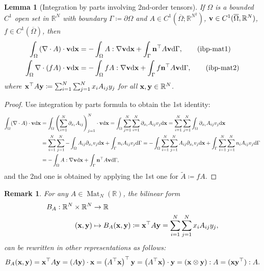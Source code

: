 \documentclass[oneside]{book}
\numberwithin{equation}{section}
\newtheorem{lemma}{Lemma}[section]
\newtheorem{remark}{Remark}[section]
\begin{document}
\begin{lemma}[Integration by parts involving 2nd-order tensors]
    If $\Omega$ is a bounded $C^1$ open set in $\mathbb{R}^N$ with boundary $\Gamma\coloneqq\partial\Omega$ and $A\in C^1(\overline{\Omega};\mathbb{R}^{N^2})$, ${\bf v}\in C^1(\overline{\Omega},\mathbb{R}^N)$, $f\in C^1(\overline{\Omega})$, then
    \begin{align}
        \int_\Omega \left(\nabla\cdot A\right)\cdot{\bf v}{\rm d}{\bf x} &= -\int_\Omega A:\nabla{\bf v}{\rm d}{\bf x} + \int_\Gamma {\bf n}^\top A{\bf v}{\rm d}\Gamma,\label{integration by parts for matrix 1}\tag{ibp-mat1}\\
        \int_\Omega \nabla\cdot(fA)\cdot{\bf v}{\rm d}{\bf x} &= -\int_\Omega fA:\nabla{\bf v}{\rm d}{\bf x} + \int_\Gamma f{\bf n}^\top A{\bf v}{\rm d}\Gamma,\label{integration by parts for matrix 2}\tag{ibp-mat2}
    \end{align}
    where ${\bf x}^\top A{\bf y}\coloneqq\sum_{i=1}^N\sum_{j=1}^N x_iA_{ij}y_j$ for all ${\bf x},{\bf y}\in\mathbb{R}^N$.
\end{lemma}

\begin{proof}
    Use integration by parts formula to obtain the 1st identity:
    \begin{align*}
        \int_\Omega (\nabla\cdot A)\cdot{\bf v}{\rm d}{\bf x} &= \int_\Omega \left(\sum_{i=1}^N \partial_{x_i}A_{ij}\right)_{j=1}^N\cdot{\bf v}{\rm d}{\bf x} = \int_\Omega \sum_{j=1}^N\sum_{i=1}^N \partial_{x_i}A_{ij}v_j{\rm d}{\bf x} = \sum_{i=1}^N\sum_{j=1}^N \int_\Omega \partial_{x_i}A_{ij}v_j{\rm d}{\bf x}\\
        &= \sum_{i=1}^N\sum_{j=1}^N -\int_\Omega A_{ij}\partial_{x_i}v_j{\rm d}{\bf x} + \int_\Gamma n_iA_{ij}v_j{\rm d}\Gamma = -\int_\Omega \sum_{i=1}^N\sum_{j=1}^N A_{ij}\partial_{x_i}v_j{\rm d}{\bf x} + \int_\Gamma \sum_{i=1}^N\sum_{j=1}^N n_iA_{ij}v_j{\rm d}\Gamma\\
        &= -\int_\Omega A:\nabla{\bf v}{\rm d}{\bf x} + \int_\Gamma {\bf n}^\top A{\bf v}{\rm d}\Gamma,
    \end{align*}
    and the 2nd one is obtained by applying the 1st one for $\widetilde{A}\coloneqq fA$.
\end{proof}

\begin{remark}
    For any $A\in\operatorname{Mat}_N(\mathbb{R})$, the bilinear form
    \begin{align*}
        B_A:\mathbb{R}^N\times\mathbb{R}^N&\to\mathbb{R}\\
        ({\bf x},{\bf y})&\mapsto B_A({\bf x},{\bf y})\coloneqq{\bf x}^\top A{\bf y} = \sum_{i=1}^N\sum_{j=1}^N x_iA_{ij}y_j,
    \end{align*}
    can be rewritten in other representations as follows:
    \begin{align*}
        B_A({\bf x},{\bf y}) = {\bf x}^\top A{\bf y} = (A{\bf y})\cdot{\bf x} = \left(A^\top{\bf x}\right)^\top{\bf y} = \left(A^\top{\bf x}\right)\cdot{\bf y} = ({\bf x}\otimes{\bf y}):A = ({\bf x}{\bf y}^\top):A.
    \end{align*}
\end{remark}
\end{document}
